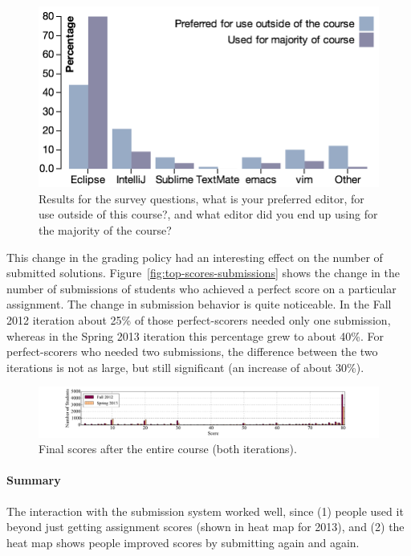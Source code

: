 \documentclass{sig-alternate}
\begin{document}
\begin{figure}[ht!]
  \centering
  \includegraphics[width=\columnwidth]{plots/ides.png}
  \caption{Results for the survey questions, what is your preferred editor, for use outside of this course?, and what editor did you end up using for the majority of the course?}
  \label{fig:ides}
\end{figure}


This change in the grading policy had an interesting effect on the number of
submitted solutions. Figure~\ref{fig:top-scores-submissions} shows the change
in the number of submissions of students who achieved a perfect score on a
particular assignment. The change in submission behavior is quite noticeable.
In the Fall 2012 iteration about 25\% of those perfect-scorers needed only one
submission, whereas in the Spring 2013 iteration this percentage grew to about
40\%. For perfect-scorers who needed two submissions, the difference between
the two iterations is not as large, but still significant (an increase of
about 30\%).

\begin{figure}[ht!]
  \centering
  \includegraphics[width=\textwidth]{plots/final-scores.pdf}
  \caption{Final scores after the entire course (both iterations).}
  \label{fig:final-scores}
\end{figure}

\paragraph{Summary}

The interaction with the submission system worked well, since (1) people used
it beyond just getting assignment scores (shown in heat map for 2013), and (2)
the heat map shows people improved scores by submitting again and again.
\end{document}
